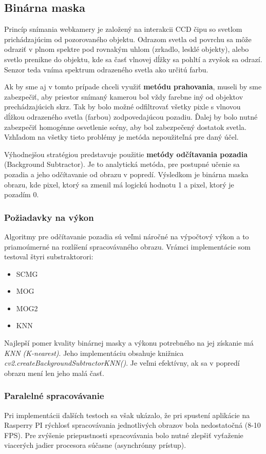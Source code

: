 \subsection{Binárna maska}
Princíp snímania webkamery je založený na interakcii CCD čipu  so svetlom prichádzajúcim od pozorovaného objektu. Odrazom svetla od povrchu sa môže odraziť v plnom spektre pod rovnakým uhlom (zrkadlo, lesklé objekty), alebo svetlo prenikne do objektu, kde sa časť vlnovej dĺžky sa pohltí a zvyšok sa odrazí. Senzor teda vníma spektrum odrazeného svetla ako určitú farbu.

Ak by sme aj v tomto prípade chceli využiť  \textbf{metódu prahovania}, museli by sme zabezpečiť, aby priestor snímaný kamerou bol vždy farebne iný od objektov prechádzajúcich skrz. Tak by bolo možné odfiltrovať všetky pixle s vlnovou dĺžkou odrazeného svetla (farbou) zodpovedajúcou pozadiu. Ďalej by bolo nutné zabezpečiť homogénne osvetlenie scény, aby bol zabezpečený dostatok svetla. Vzhľadom na všetky tieto problémy je metóda nepoužiteľná pre daný účel.

Výhodnejšou stratégiou predstavuje použitie \textbf{metódy odčítavania pozadia} (Background Subtractor). Je to analytická metóda, pre postupné učenie sa pozadia a jeho odčítavanie od obrazu v popredí. Výsledkom je binárna maska obrazu, kde pixel, ktorý sa zmenil má logickú hodnotu 1 a pixel, ktorý je pozadím 0. 

\subsubsection{Požiadavky na výkon}
Algoritmy pre odčítavanie pozadia sú veľmi náročné na výpočtový výkon  a to priamoúmerné na rozlíšení spracovávaného obrazu. Vrámci  implementácie som testoval štyri substraktorori:
\begin{itemize}
\item SCMG
\item MOG
\item MOG2
\item KNN
\end{itemize}

Najlepší pomer kvality binárnej masky a výkonu potrebného na jej získanie má \textit{KNN (K-nearest)}. Jeho implementáciu obsahuje knižnica  \textit{cv2.createBackgroundSubtractorKNN()}. Je veľmi efektívny, ak sa v popredí obrazu mení len jeho malá časť. 

\subsubsection{Paralelné spracovávanie}
Pri implementácii ďalších testoch sa však ukázalo, že pri spustení aplikácie na Rasperry PI rýchlosť spracovávania jednotlivých obrazov bola nedostatočná (8-10 FPS). Pre zvýšenie priepustnosti spracovávania bolo nutné zlepšiť vyťaženie viacerých jadier procesora súčasne (asynchrónny prístup). 

